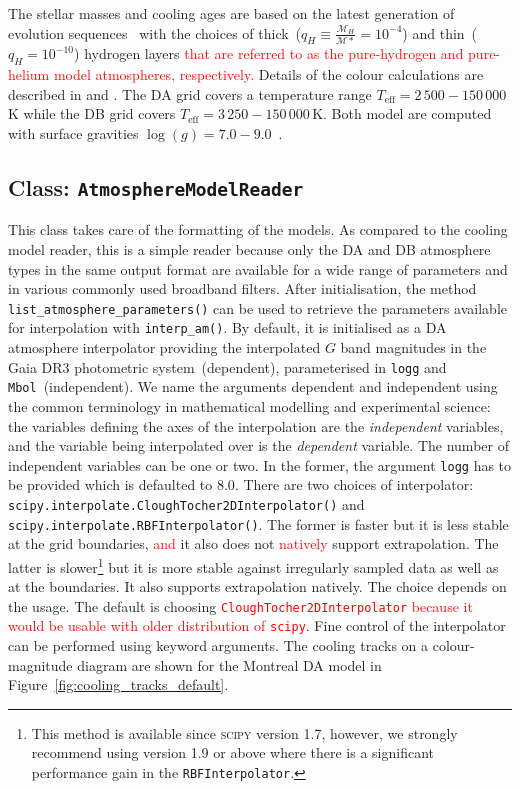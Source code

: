 \documentclass[fleqn,usenatbib]{rasti}
\begin{document}
The stellar masses and cooling ages are based on the latest generation of
evolution sequences~\citep{2020ApJ...901...93B} with the choices of
thick~($q_H \equiv \frac{\mathcal{M}_H}{\mathcal{M}*} = 10^{-4}$) and thin~($q_H = 10^{-10}$)
hydrogen layers \textcolor{red}{that are referred to as the pure-hydrogen and
pure-helium model atmospheres, respectively.} Details of the colour calculations
are described in \citet{1995PASP..107.1047B} and \citet{2006AJ....132.1221H}.
The DA grid covers a temperature range $T_{\mathrm{eff}} = 2\,500 - 150\,000$\,K
while the DB grid covers $T_{\mathrm{eff}} = 3\,250 - 150\,000$\,K. Both model
are computed with surface gravities $\log(g) = 7.0 - 9.0$~\citep{
2018ApJ...863..184B, 2020ApJ...901...93B, 2011ApJ...730..128T,
2011ApJ...737...28B, 2006ApJ...651L.137K}.

\subsection{Class: \texttt{AtmosphereModelReader}}
This class takes care of the formatting of the models. As compared to the
cooling model reader, this is a simple reader because only the DA and DB
atmosphere types in the same output format are available for a wide range of
parameters and in various commonly used broadband filters. After initialisation,
the method \verb+list_atmosphere_parameters()+ can be used to retrieve the
parameters available for interpolation with \verb+interp_am()+. By default, it
is initialised as a DA atmosphere interpolator providing the interpolated $G$
band magnitudes in the Gaia DR3 photometric system~(dependent), parameterised
in \verb+logg+ and \verb+Mbol+~(independent). We name the arguments dependent
and independent using the common terminology in mathematical modelling and
experimental science: the variables defining the axes of the interpolation are
the \textit{independent} variables, and the variable being interpolated over
is the \textit{dependent} variable. The number of independent variables can be
one or two. In the former, the argument \verb+logg+ has to be provided which
is defaulted to $8.0$. There are two choices of interpolator:
\verb+scipy.interpolate.CloughTocher2DInterpolator()+ and 
\verb+scipy.interpolate.RBFInterpolator()+. The former is faster but it is less
stable at the grid boundaries, \textcolor{red}{and} it also does not \textcolor{red}{natively} support extrapolation. The
latter is slower\footnote{This method is available since \textsc{scipy}
version 1.7, however, we strongly recommend using version 1.9 or above where
there is a significant performance gain in the \verb+RBFInterpolator+.} but it is more
stable against irregularly sampled data as well as at the boundaries. It also
supports extrapolation natively. The choice depends on the usage. The
default is choosing \textcolor{red}{\verb+CloughTocher2DInterpolator+ because
it would be usable with older distribution of \texttt{scipy}}. Fine control
of the interpolator can be performed using keyword arguments. The cooling
tracks on a colour-magnitude diagram are shown for the Montreal DA model
in Figure~\ref{fig:cooling_tracks_default}.
\end{document}
